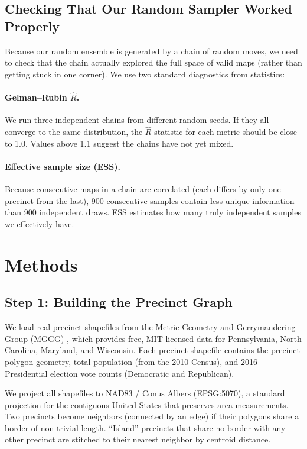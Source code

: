 \documentclass[11pt]{article}
\begin{document}
\subsection{Checking That Our Random Sampler Worked Properly}

Because our random ensemble is generated by a chain of random moves,
we need to check that the chain actually explored the full space of
valid maps (rather than getting stuck in one corner). We use two
standard diagnostics from statistics:

\paragraph{Gelman--Rubin $\hat{R}$.} We run three independent chains
from different random seeds. If they all converge to the same
distribution, the $\hat{R}$ statistic for each metric should be close
to 1.0. Values above 1.1 suggest the chains have not yet mixed.

\paragraph{Effective sample size (ESS).} Because consecutive maps in a
chain are correlated (each differs by only one precinct from the last),
900 consecutive samples contain less unique information than 900
independent draws. ESS estimates how many truly independent samples
we effectively have.

\section{Methods}
\label{sec:method}

\subsection{Step 1: Building the Precinct Graph}

We load real precinct shapefiles from the Metric Geometry and
Gerrymandering Group (MGGG) \cite{mggg}, which provides free,
MIT-licensed data for Pennsylvania, North Carolina, Maryland, and
Wisconsin. Each precinct shapefile contains the precinct polygon
geometry, total population (from the 2010 Census), and 2016
Presidential election vote counts (Democratic and Republican).

We project all shapefiles to NAD83 / Conus Albers (EPSG:5070), a
standard projection for the contiguous United States that preserves
area measurements. Two precincts become neighbors (connected by an
edge) if their polygons share a border of non-trivial length.
``Island'' precincts that share no border with any other precinct are
stitched to their nearest neighbor by centroid distance.
\end{document}
